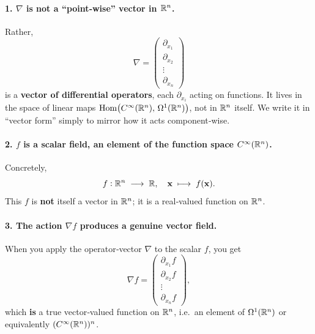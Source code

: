 \documentclass[11pt,openany]{article}
\renewcommand{\emph}[1]{\textbf{#1}}
\begin{document}
\paragraph{1. \(\nabla\) is not a “point‐wise” vector in \(\mathbb{R}^n\).}  Rather, 
\[
\nabla
=\begin{pmatrix}
	\partial_{x_1}\\
	\partial_{x_2}\\
	\vdots\\
	\partial_{x_n}
\end{pmatrix}
\]
is a \emph{vector of differential operators}, each \(\partial_{x_i}\) acting on functions.  It lives in the space of linear maps
\(\mathrm{Hom}\bigl(C^\infty(\mathbb{R}^n),\,\Omega^1(\mathbb{R}^n)\bigr)\), not in \(\mathbb{R}^n\) itself.  We write it in “vector form” simply to mirror how it acts component‐wise.

\paragraph{2. \(f\) is a scalar field, an element of the function space \(C^\infty(\mathbb{R}^n)\).}  Concretely,
\[
f: \mathbb{R}^n\;\longrightarrow\;\mathbb{R},
\quad
\mathbf x\;\longmapsto\;f(\mathbf x).
\]
This \(f\) is \emph{not} itself a vector in \(\mathbb{R}^n\); it is a real‐valued function on \(\mathbb{R}^n\).

\paragraph{3. The action \(\nabla f\) produces a genuine vector field.}  When you apply the operator‐vector \(\nabla\) to the scalar \(f\), you get
\[
\nabla f
=\begin{pmatrix}
	\partial_{x_1}f\\
	\partial_{x_2}f\\
	\vdots\\
	\partial_{x_n}f
\end{pmatrix},
\]
which \emph{is} a true vector‐valued function on \(\mathbb{R}^n\), i.e.\ an element of \(\Omega^1(\mathbb{R}^n)\) or equivalently \((C^\infty(\mathbb{R}^n))^n\).

\medskip
\end{document}
